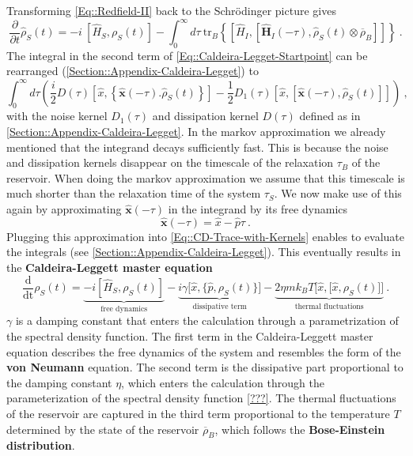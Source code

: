	Transforming \autoref{Eq::Redfield-II} back to the Schrödinger picture gives
	\begin{equation} \label{Eq::Caldeira-Legget-Startpoint}
		\frac{\partial}{\partial t} {\hat{\rho}}_S(t) =	-i~\left[\hat{H}_S, \rho_S(t)\right] - \int_{0}^{\infty} d\tau~ \text{tr}_B \left\{  \left[{\hat{H}}_I, \left[{\boldsymbol{\hat{H}}}_I(- \tau), {\hat{\rho}}_S(t) \otimes \overline{\rho}_B \right]\right]  \right\}~.
	\end{equation}
	The integral in the second term of \autoref{Eq::Caldeira-Legget-Startpoint} can be rearranged (\autoref{Section::Appendix-Caldeira-Legget}) to
	\begin{equation} \label{Eq::CD-Trace-with-Kernels}
		\int_{0}^{\infty} d\tau \left(\frac{i}{2} D(\tau) \left[\hat{x}, \left\{\boldsymbol{\hat{x}}(-\tau). \hat{\rho}_S(t)\right\}\right] - \frac{1}{2} D_1(\tau) \left[\hat{x}, \left[\boldsymbol{\hat{x}}(-\tau) , \hat{\rho}_S(t)\right]\right]\right)~,
	\end{equation}
	with the noise kernel $D_1(\tau)$ and dissipation kernel $D(\tau)$ defined as in \autoref{Section::Appendix-Caldeira-Legget}. In the markov approximation we already mentioned that the integrand decays sufficiently fast. This is because the noise and dissipation kernels disappear on the timescale of the relaxation $\tau_B$ of the reservoir. When doing the markov approximation we assume that this timescale is much shorter than the relaxation time of the system $\tau_S$. We now make use of this again by approximating $\boldsymbol{\hat{x}}(-\tau)$ in the integrand by its free dynamics
	\begin{equation}
		\boldsymbol{\hat{x}}(-\tau) =	\hat{x} - \hat{p} \tau~.
	\end{equation}
	Plugging this approximation into \autoref{Eq::CD-Trace-with-Kernels} enables to evaluate the integrals (see \autoref{Section::Appendix-Caldeira-Legget}). This eventually results in the \textbf{Caldeira-Leggett master equation}
	\begin{equation} \label{Eq::Caldeira-Leggett-Master-equation}
		\frac{\text{d}}{\text{dt}} \rho_S(t) =	\underbrace{-i\left[\hat{H}_S, \rho_S(t) \right]}_{\text{free dynamics}} - \underbrace{i \gamma \Big [\hat{x}, \big\{\hat{p}, \rho_S(t)\big\}\Big ]}_\text{dissipative term} - \underbrace{2 \eta m k_B T \Big [\hat{x}, \big[\hat{x}, \rho_S(t)\big]\Big ]}_\text{thermal fluctuations}~.
	\end{equation}
	$\gamma$ is a damping constant that enters the calculation through a parametrization of the spectral density function. The first term in the Caldeira-Leggett master equation describes the free dynamics of the system and resembles the form of the \textbf{von Neumann} equation. The second term is the dissipative part proportional to the damping constant $\eta$, which enters the calculation through the parameterization of the spectral density function \autoref{???}. The thermal fluctuations of the reservoir are captured in the third term proportional to the temperature $T$ determined by the state of the reservoir $\overline{\rho}_B$, which follows the \textbf{Bose-Einstein distribution}.
